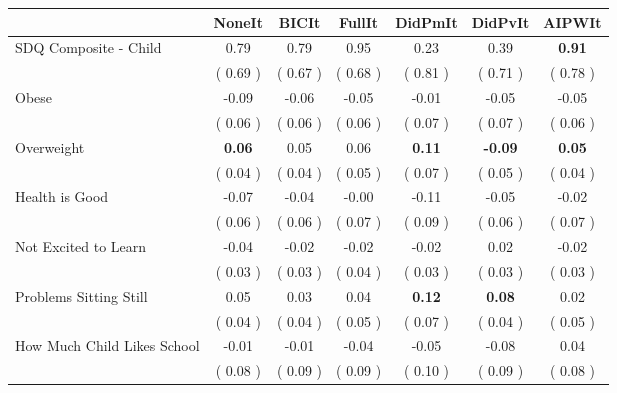 \begin{tabular}{l c c c c c c}
\toprule
 & NoneIt & BICIt & FullIt & DidPmIt & DidPvIt & AIPWIt \\
\midrule
SDQ Composite - Child &      0.79 &      0.79 &      0.95 &      0.23 &      0.39 & \textbf{     0.91} \\
& (     0.69 ) & (     0.67 ) & (     0.68 ) & (     0.81 ) & (     0.71 ) & (     0.78 ) \\
Obese &     -0.09 &     -0.06 &     -0.05 &     -0.01 &     -0.05 &     -0.05 \\
& (     0.06 ) & (     0.06 ) & (     0.06 ) & (     0.07 ) & (     0.07 ) & (     0.06 ) \\
Overweight & \textbf{      0.06 } &      0.05 &      0.06 & \textbf{      0.11 } & \textbf{     -0.09 } & \textbf{     0.05} \\
& (     0.04 ) & (     0.04 ) & (     0.05 ) & (     0.07 ) & (     0.05 ) & (     0.04 ) \\
Health is Good &     -0.07 &     -0.04 &     -0.00 &     -0.11 &     -0.05 &     -0.02 \\
& (     0.06 ) & (     0.06 ) & (     0.07 ) & (     0.09 ) & (     0.06 ) & (     0.07 ) \\
Not Excited to Learn &     -0.04 &     -0.02 &     -0.02 &     -0.02 &      0.02 &     -0.02 \\
& (     0.03 ) & (     0.03 ) & (     0.04 ) & (     0.03 ) & (     0.03 ) & (     0.03 ) \\
Problems Sitting Still &      0.05 &      0.03 &      0.04 & \textbf{      0.12 } & \textbf{      0.08 } &      0.02 \\
& (     0.04 ) & (     0.04 ) & (     0.05 ) & (     0.07 ) & (     0.04 ) & (     0.05 ) \\
How Much Child Likes School &     -0.01 &     -0.01 &     -0.04 &     -0.05 &     -0.08 &      0.04 \\
& (     0.08 ) & (     0.09 ) & (     0.09 ) & (     0.10 ) & (     0.09 ) & (     0.08 ) \\
\bottomrule
\end{tabular}
